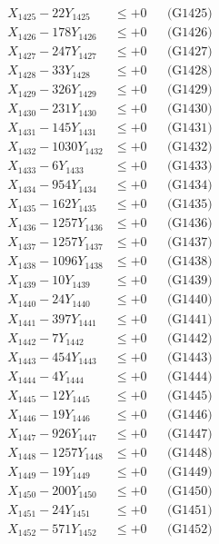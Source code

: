 \documentclass[a4paper,10pt]{article}
\begin{document}
{\begin{align}
X_{1425} - 22Y_{1425} &\leq +0 && \text{(G1425)} \\
X_{1426} - 178Y_{1426} &\leq +0 && \text{(G1426)} \\
X_{1427} - 247Y_{1427} &\leq +0 && \text{(G1427)} \\
X_{1428} - 33Y_{1428} &\leq +0 && \text{(G1428)} \\
X_{1429} - 326Y_{1429} &\leq +0 && \text{(G1429)} \\
X_{1430} - 231Y_{1430} &\leq +0 && \text{(G1430)} \\
\allowbreak
X_{1431} - 145Y_{1431} &\leq +0 && \text{(G1431)} \\
X_{1432} - 1030Y_{1432} &\leq +0 && \text{(G1432)} \\
X_{1433} - 6Y_{1433} &\leq +0 && \text{(G1433)} \\
X_{1434} - 954Y_{1434} &\leq +0 && \text{(G1434)} \\
X_{1435} - 162Y_{1435} &\leq +0 && \text{(G1435)} \\
X_{1436} - 1257Y_{1436} &\leq +0 && \text{(G1436)} \\
X_{1437} - 1257Y_{1437} &\leq +0 && \text{(G1437)} \\
X_{1438} - 1096Y_{1438} &\leq +0 && \text{(G1438)} \\
X_{1439} - 10Y_{1439} &\leq +0 && \text{(G1439)} \\
X_{1440} - 24Y_{1440} &\leq +0 && \text{(G1440)} \\
\allowbreak
X_{1441} - 397Y_{1441} &\leq +0 && \text{(G1441)} \\
X_{1442} - 7Y_{1442} &\leq +0 && \text{(G1442)} \\
X_{1443} - 454Y_{1443} &\leq +0 && \text{(G1443)} \\
X_{1444} - 4Y_{1444} &\leq +0 && \text{(G1444)} \\
X_{1445} - 12Y_{1445} &\leq +0 && \text{(G1445)} \\
X_{1446} - 19Y_{1446} &\leq +0 && \text{(G1446)} \\
X_{1447} - 926Y_{1447} &\leq +0 && \text{(G1447)} \\
X_{1448} - 1257Y_{1448} &\leq +0 && \text{(G1448)} \\
X_{1449} - 19Y_{1449} &\leq +0 && \text{(G1449)} \\
X_{1450} - 200Y_{1450} &\leq +0 && \text{(G1450)} \\
\allowbreak
X_{1451} - 24Y_{1451} &\leq +0 && \text{(G1451)} \\
X_{1452} - 571Y_{1452} &\leq +0 && \text{(G1452)} \\

\end{align}}
\end{document}
